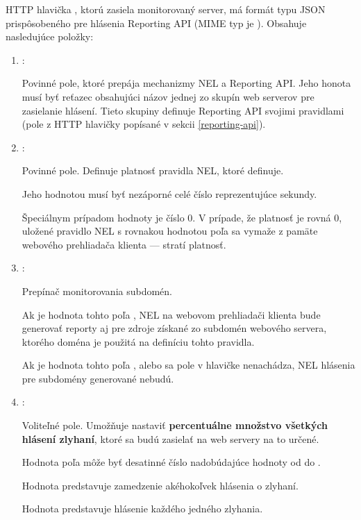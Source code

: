 HTTP hlavička , ktorú zasiela monitorovaný server, má formát typu JSON prispôsobeného pre hlásenia Reporting API (MIME typ je ).
Obsahuje nasledujúce položky:
\begin{enumerate}
    \item {}:

    Povinné pole, ktoré prepája mechanizmy NEL a Reporting API.
    Jeho honota musí byť reťazec obsahujúci názov jednej zo skupín web serverov pre zasielanie hlásení.
    Tieto skupiny definuje Reporting API svojimi pravidlami (pole  z HTTP hlavičky  popísané v sekcii \ref{reporting-api}).
    
    \item {}:

    Povinné pole.
    Definuje platnosť pravidla NEL, ktoré definuje.
    
    Jeho hodnotou musí byť nezáporné celé číslo reprezentujúce sekundy.

    Špeciálnym prípadom hodnoty je číslo 0.
    V prípade, že platnosť je rovná 0, uložené pravidlo NEL s rovnakou hodnotou poľa  sa vymaže z pamäte webového prehliadača klienta --- stratí platnosť. 
    
    \item {}:

    Prepínač monitorovania subdomén. 
    
    Ak je hodnota tohto poľa , NEL na webovom prehliadači klienta bude generovať reporty aj pre zdroje získané zo subdomén webového servera, ktorého doména 
    je použitá na definíciu tohto pravidla.
    
    Ak je hodnota tohto poľa , alebo sa pole v hlavičke nenachádza, NEL hlásenia pre subdomény generované nebudú.

    \item {}:

    Voliteľné pole. Umožňuje nastaviť \textbf{percentuálne množstvo všetkých hlásení zlyhaní}, ktoré sa budú zasielať na web servery na to určené.

    Hodnota poľa môže byť desatinné číslo nadobúdajúce hodnoty od  do .
    
    Hodnota  predstavuje zamedzenie akéhokoľvek hlásenia o zlyhaní. 
    
    Hodnota  predstavuje hlásenie každého jedného zlyhania.


\end{enumerate}
